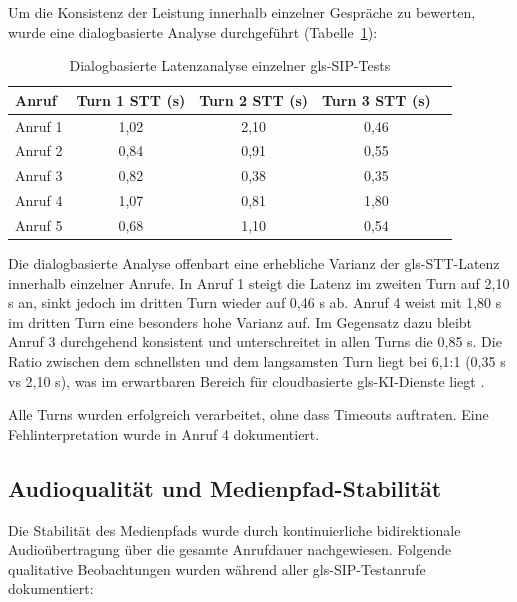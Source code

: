 Um die Konsistenz der Leistung innerhalb einzelner Gespräche zu bewerten, wurde eine dialogbasierte Analyse durchgeführt (Tabelle~\ref{tab:turn-latencies}):

\begin{table}[H]
  \centering
  \begin{tabular}{|l|c|c|c|c|}
    \hline
    \textbf{Anruf} & \textbf{Turn 1 STT (s)} & \textbf{Turn 2 STT (s)} & \textbf{Turn 3 STT (s)} \\ \hline
    Anruf 1 & 1,02 & 2,10 & 0,46  \\ \hline
    Anruf 2 & 0,84 & 0,91 & 0,55  \\ \hline
    Anruf 3 & 0,82 & 0,38 & 0,35  \\ \hline
    Anruf 4 & 1,07 & 0,81 & 1,80  \\ \hline
    Anruf 5 & 0,68 & 1,10 & 0,54  \\ \hline
  \end{tabular}
  \caption{Dialogbasierte Latenzanalyse einzelner \gls{gls-SIP}-Tests}
  \label{tab:turn-latencies}
\end{table}

Die dialogbasierte Analyse offenbart eine erhebliche Varianz der \gls{gls-STT}-Latenz innerhalb einzelner Anrufe. In Anruf 1 steigt die Latenz im zweiten Turn auf 2,10 s an, sinkt jedoch im dritten Turn wieder auf 0,46 s ab. Anruf 4 weist mit 1,80 s im dritten Turn eine besonders hohe Varianz auf. Im Gegensatz dazu bleibt Anruf 3 durchgehend konsistent und unterschreitet in allen Turns die 0,85 s. Die Ratio zwischen dem schnellsten und dem langsamsten Turn liegt bei 6,1:1 (0,35 s vs 2,10 s), was im erwartbaren Bereich für cloudbasierte \gls{gls-KI}-Dienste liegt \parencite{whisper_quant_2025,ITU-T-G114}.

Alle Turns wurden erfolgreich verarbeitet, ohne dass Timeouts auftraten. Eine Fehlinterpretation wurde in Anruf 4 dokumentiert.

\subsection{Audioqualität und Medienpfad-Stabilität}

Die Stabilität des Medienpfads wurde durch kontinuierliche bidirektionale Audioübertragung über die gesamte Anrufdauer nachgewiesen. Folgende qualitative Beobachtungen wurden während aller \gls{gls-SIP}-Testanrufe dokumentiert:

